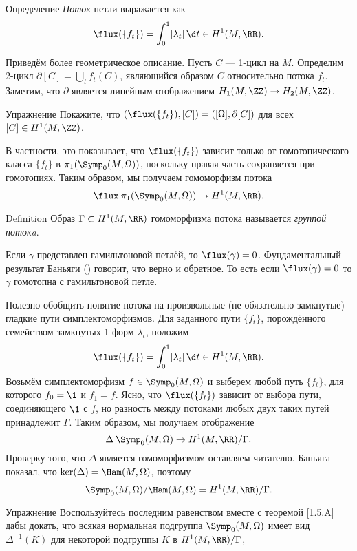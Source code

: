\begin{ex*}{Определение}
\emph{Поток} петли выражается как 
\[\flux(\{f_t\}) = \int_0^1 [\lambda_t]\,\d t \in H^1(M, \RR).\]
\end{ex*}

Приведём более геометрическое описание.
Пусть $C$ --- 1-цикл на $M$.
Определим 2-цикл $\partial[C] = \bigcup_t f_t(C)$, являющийся образом $C$ относительно потока $f_t$.
Заметим, что $\partial$ является линейным отображением $H_1(M,\ZZ)\to H_2(M,\ZZ)$.

\begin{ex*}{Упражнение}
Покажите, что $(\flux(\{f_t\}), [C]) = ([\Omega], \partial[C])$ для всех $[C]\in H^1(M,\ZZ)$.
\end{ex*}

В частности, это показывает, что $\flux(\{f_t\})$ зависит только от гомотопического класса $\{f_t\}$ в $\pi_1 (\Symp_0(M,\Omega))$, поскольку правая часть сохраняется при гомотопиях.
Таким образом, мы получаем гомоморфизм потока
\[\flux\:\pi_1(\Symp_0(M,\Omega))\to H^1(M,\RR).\]

\begin{ex*}{Definition}
Образ $\Gamma \subset H^1(M, \RR)$ гомоморфизма потока называется \emph{группой потокa}.
\end{ex*}


Если $\gamma$ представлен гамильтоновой петлёй, то $\flux(\gamma) = 0$.
Фундаментальный результат Баньяги (\cite{B1}) говорит, что верно и обратное.
То есть если $\flux(\gamma) = 0$ то $\gamma$ гомотопна с гамильтоновой петле.

Полезно обобщить понятие потока на произвольные (не обязательно замкнутые) гладкие пути симплектоморфизмов.
Для заданного пути $\{f_t\}$, порождённого семейством замкнутых 1-форм $\lambda_t$, положим 
\[\flux(\{f_t\})=\int_0^1[\lambda_t]\,\d t\in H^1(M,\RR).\]
Возьмём симплектоморфизм $f \in \Symp_0(M,\Omega)$ и выберем любой путь $\{f_t\}$, для которого $f_0 = \1$ и $f_1 = f$.
Ясно, что $\flux (\{f_t\})$ зависит от выбора пути, соединяющего $\1$ с $f$, но разность между потоками любых двух таких путей принадлежит $\Gamma$.
Таким образом, мы получаем отображение
\[\Delta\:\Symp_0(M,\Omega)\to H^1(M,\RR)/\Gamma.\]
Проверку того, что $\Delta$ является гомоморфизмом оставляем читателю.
Баньяга показал, что $\ker(\Delta) = \Ham(M,\Omega)$, поэтому 
\[\Symp_0(M,\Omega)/\Ham(M,\Omega) = H^1(M, \RR)/\Gamma.\]

\begin{ex}{Упражнение}\label{14.1.B}
Воспользуйтесь последним равенством вместе с теоремой \ref{1.5.A} дабы докать, что всякая нормальная подгруппа $\Symp_0(M,\Omega)$ имеет вид $\Delta^{-1}(K)$ для некоторой подгруппы $K$ в $H^1(M, \RR)/\Gamma$,
\end{ex}

